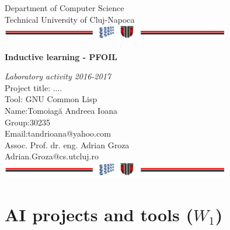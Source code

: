 \documentclass[a4paper,12pt]{report}
\begin{document}
\vspace{-5cm}
\begin{center}
Department of Computer Science\\
Technical University of Cluj-Napoca\\
\includegraphics[width=10cm]{fig/footer}
\end{center}
\vspace{1cm}
\begin{center}
\begin{Large}
\textbf{Inductive learning - PFOIL}\\
\end{Large}
\textit{Laboratory activity 2016-2017}\\
\vspace{3cm}
Project title: ....\\
Tool: GNU Common Lisp\\
\vspace{1.5cm}
Name:Tomoiagă Andreea Ioana\\
Group:30235\\
Email:tandrioana@yahoo.com\\
\vspace{6cm}
Assoc. Prof. dr. eng. Adrian Groza\\
Adrian.Groza@cs.utcluj.ro\\
\vspace{1cm}
\includegraphics[width=10cm]{fig/footer}
\end{center}

\tableofcontents


\chapter{AI projects and tools ($W_1$)}
\end{document}

